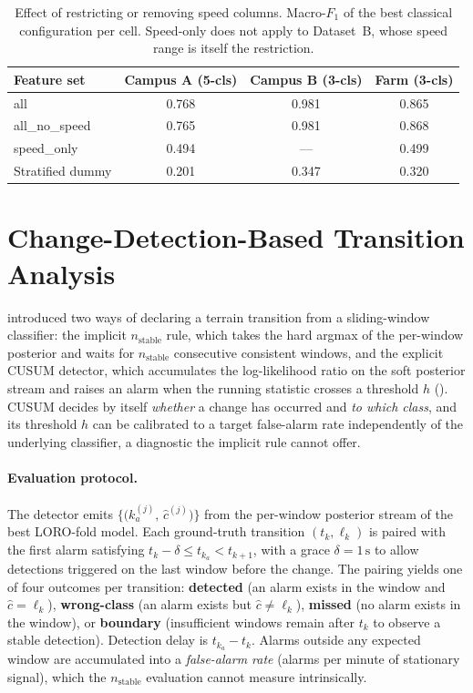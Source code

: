 \vspace{-3mm}
\begin{table}[H]
\centering
\small
\caption{Effect of restricting or removing speed columns. Macro-$F_1$ of the best classical configuration per cell. Speed-only does not apply to Dataset~B, whose speed range is itself the restriction.}
\label{tab:speed_only}
\begin{tabular}{lccc}
\toprule
\textbf{Feature set} & \textbf{Campus A (5-cls)} & \textbf{Campus B (3-cls)} & \textbf{Farm (3-cls)} \\
\midrule
all                 & 0.768 & 0.981 & 0.865 \\
all\_no\_speed      & 0.765 & 0.981 & 0.868 \\
speed\_only         & 0.494 & ---   & 0.499 \\
Stratified dummy    & 0.201 & 0.347 & 0.320 \\
\bottomrule
\end{tabular}
\end{table}


\section{Change-Detection-Based Transition Analysis}
\label{sec:res_transition}

 introduced two ways of declaring a terrain transition from a sliding-window classifier: the implicit $n_{\text{stable}}$ rule, which takes the hard argmax of the per-window posterior and waits for $n_{\text{stable}}$ consecutive consistent windows, and the explicit CUSUM detector, which accumulates the log-likelihood ratio on the soft posterior stream and raises an alarm when the running statistic crosses a threshold $h$ (). CUSUM decides by itself \emph{whether} a change has occurred and \emph{to which class}, and its threshold $h$ can be calibrated to a target false-alarm rate independently of the underlying classifier, a diagnostic the implicit rule cannot offer.

\paragraph{Evaluation protocol.} The detector emits $\bigl\{\bigl(k_a^{(j)},\,\hat{c}^{(j)}\bigr)\bigr\}$ from the per-window posterior stream of the best LORO-fold model. Each ground-truth transition $(t_k,\ell_k)$ is paired with the first alarm satisfying $t_k - \delta \le t_{k_a} < t_{k+1}$, with a grace $\delta = 1\,\text{s}$ to allow detections triggered on the last window before the change. The pairing yields one of four outcomes per transition: \textbf{detected} (an alarm exists in the window and $\hat{c} = \ell_k$), \textbf{wrong-class} (an alarm exists but $\hat{c}\neq\ell_k$), \textbf{missed} (no alarm exists in the window), or \textbf{boundary} (insufficient windows remain after $t_k$ to observe a stable detection). Detection delay is $t_{k_a} - t_k$. Alarms outside any expected window are accumulated into a \emph{false-alarm rate} (alarms per minute of stationary signal), which the $n_{\text{stable}}$ evaluation cannot measure intrinsically.

